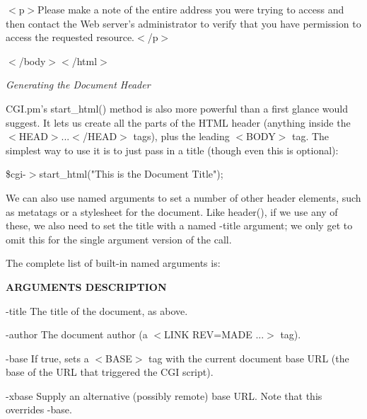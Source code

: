 \documentclass[a4paper,11pt]{book}
\begin{document}
\noindent 

\noindent $<$p$>$Please make a note of the entire address you were trying to access and then contact the Web server's administrator to verify that you have permission to access the requested resource.$<$/p$>$

\noindent 

\noindent $<$/body$>$$<$/html$>$

\noindent 

\noindent \textit{Generating the Document Header}

\noindent CGI.pm's start\_html() method is also more powerful than a first glance would suggest. It lets us create all the parts of the HTML header (anything inside the $<$HEAD$>$...$<$/HEAD$>$ tags), plus the leading $<$BODY$>$ tag. The simplest way to use it is to just pass in a title (though even this is optional):

\noindent 

\noindent \$cgi-$>$start\_html("This is the Document Title");

\noindent 

\noindent We can also use named arguments to set a number of other header elements, such as metatags or a stylesheet for the document. Like header(), if we use any of these, we also need to set the title with a named -title argument; we only get to omit this for the single argument version of the call.

\noindent 

\noindent The complete list of built-in named arguments is:

\noindent 

\noindent 

\noindent \textbf{ARGUMENTS DESCRIPTION}

\noindent 

\noindent -title The title of the document, as above.

\noindent 

\noindent -author The document author (a $<$LINK REV=MADE ...$>$ tag).

\noindent 

\noindent -base If true, sets a $<$BASE$>$ tag with the current document base URL (the base of the URL that triggered the CGI script).

\noindent 

\noindent -xbase Supply an alternative (possibly remote) base URL. Note that this overrides -base.

\noindent 
\end{document}
